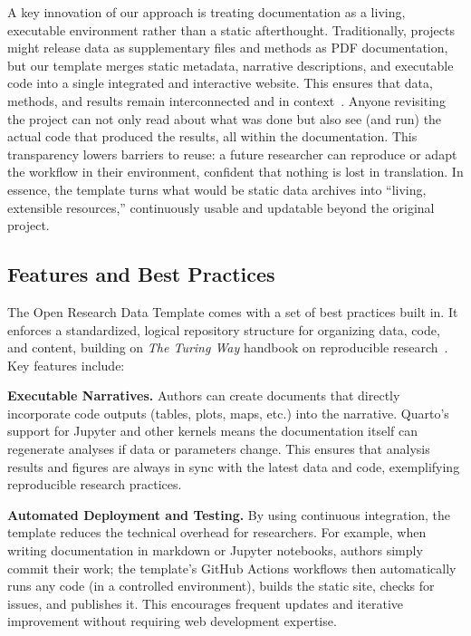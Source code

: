\documentclass[final]{anthology-ch} %
\begin{document}
A key innovation of our approach is treating documentation as a living, executable environment rather than a static afterthought. Traditionally, projects might release data as supplementary files and methods as PDF documentation, but our template merges static metadata, narrative descriptions, and executable code into a single integrated and interactive website. This ensures that data, methods, and results remain interconnected and in context~\cite{rule2019}. Anyone revisiting the project can not only read about what was done but also see (and run) the actual code that produced the results, all within the documentation. This transparency lowers barriers to reuse: a future researcher can reproduce or adapt the workflow in their environment, confident that nothing is lost in translation. In essence, the template turns what would be static data archives into ``living, extensible resources,'' continuously usable and updatable beyond the original project.

\subsection{Features and Best Practices}\label{features-and-best-practices}

The Open Research Data Template comes with a set of best practices built in. It enforces a standardized, logical repository structure for organizing data, code, and content, building on \emph{The Turing Way} handbook on reproducible research~\cite{theturingwaycommunity2025}. Key features include:



\noindent
\textbf{Executable Narratives.} Authors can create documents that directly incorporate code outputs (tables, plots, maps, etc.) into the narrative. Quarto's support for Jupyter and other kernels means the documentation itself can regenerate analyses if data or parameters change. This ensures that analysis results and figures are always in sync with the latest data and code, exemplifying reproducible research practices.



\noindent
\textbf{Automated Deployment and Testing.} By using continuous integration, the template reduces the technical overhead for researchers. For example, when writing documentation in markdown or Jupyter notebooks, authors simply commit their work; the template's GitHub Actions workflows then automatically runs any code (in a controlled environment), builds the static site, checks for issues, and publishes it. This encourages frequent updates and iterative improvement without requiring web development expertise.
\end{document}
